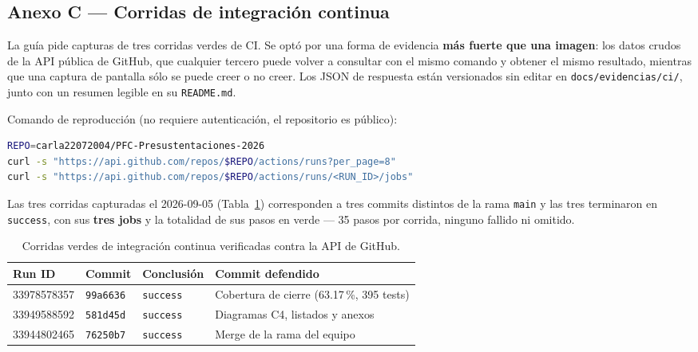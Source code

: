 \subsection{Anexo C --- Corridas de integración continua}
\label{anexo:ci}

La guía pide capturas de tres corridas verdes de CI. Se optó por una forma de evidencia
\textbf{más fuerte que una imagen}: los datos crudos de la API pública de GitHub, que cualquier tercero
puede volver a consultar con el mismo comando y obtener el mismo resultado, mientras que una captura de
pantalla sólo se puede creer o no creer. Los JSON de respuesta están versionados sin editar en
\texttt{docs/evidencias/ci/}, junto con un resumen legible en su \texttt{README.md}.

Comando de reproducción (no requiere autenticación, el repositorio es público):

\begin{lstlisting}[language=bash,style=codigobase,caption={Consulta de las corridas de CI contra la API publica de GitHub.},label={lst:ci-api}]
REPO=carla22072004/PFC-Presustentaciones-2026
curl -s "https://api.github.com/repos/$REPO/actions/runs?per_page=8"
curl -s "https://api.github.com/repos/$REPO/actions/runs/<RUN_ID>/jobs"
\end{lstlisting}

Las tres corridas capturadas el 2026-09-05 (Tabla~\ref{tab:ci-runs}) corresponden a tres commits
distintos de la rama \texttt{main} y las tres terminaron en \texttt{success}, con sus \textbf{tres jobs}
y la totalidad de sus pasos en verde --- 35 pasos por corrida, ninguno fallido ni omitido.

\begin{table}[H]
\centering
\small
\begin{tabular}{p{2.6cm}p{1.7cm}p{2.2cm}p{6.4cm}}
\toprule
\textbf{Run ID} & \textbf{Commit} & \textbf{Conclusión} & \textbf{Commit defendido} \\
\midrule
33978578357 & \texttt{99a6636} & \texttt{success} & Cobertura de cierre (63.17\,\%, 395 tests) \\
33949588592 & \texttt{581d45d} & \texttt{success} & Diagramas C4, listados y anexos \\
33944802465 & \texttt{76250b7} & \texttt{success} & Merge de la rama del equipo \\
\bottomrule
\end{tabular}
\caption{Corridas verdes de integración continua verificadas contra la API de GitHub.}
\label{tab:ci-runs}
\end{table}


